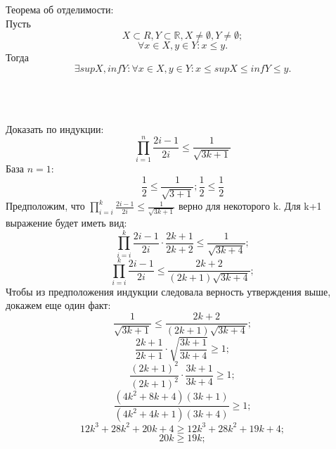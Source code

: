 \section{}
\subsection{}
	Теорема об отделимости:\\
	Пусть $$X \subset R, Y\subset \mathbb{R}, X \neq \emptyset, Y\neq\emptyset;$$
	$$\forall x\in X, y\in Y: x\leq y.$$
	Тогда $$\exists supX, infY: \forall x\in X, y\in Y: x\leq supX\leq infY\leq y.$$
	\\\\
\subsection{}
	Доказать по индукции: $$\prod_{i=1}^n\frac{2i - 1}{2i}\leq\frac{1}{\sqrt{3k+1}}$$
	База $n = 1$:
	$$\frac{1}{2}\leq\frac{1}{\sqrt{3+1}}; \frac{1}{2}\leq\frac{1}{2}$$
	Предположим, что $\prod_{i=i}^{k}\frac{2i - 1}{2i}\leq\frac{1}{\sqrt{3k+1}}$ верно для некоторого k. Для k+1 выражение будет иметь вид:
	$$\prod_{i=i}^{k}\frac{2i - 1}{2i}\cdot\frac{2k + 1}{2k+2}\leq\frac{1}{\sqrt{3k+4}};$$
	$$\prod_{i=i}^{k}\frac{2i - 1}{2i}\leq\frac{2k + 2}{(2k+1)\sqrt{3k+4}};$$
	Чтобы из предположения индукции следовала верность утверждения выше, докажем еще один факт:
	$$\frac{1}{\sqrt{3k+1}}\leq\frac{2k + 2}{(2k+1)\sqrt{3k+4}};$$
	$$\frac{2k+1}{2k+1}\cdot\sqrt{\frac{3k + 1}{3k+4}}\geq 1;$$
	$$\frac{(2k+1)^2}{(2k+1)^2}\cdot\frac{3k + 1}{3k+4}\geq 1;$$
	$$\frac{(4k^2+8k+4)(3k+1)}{(4k^2+4k+1)(3k+4)}\geq 1;$$
	$$12k^3+28k^2+20k+4\geq 12k^3+28k^2+19k+4;$$
	$$20k\geq 19k;$$
	\\\\
